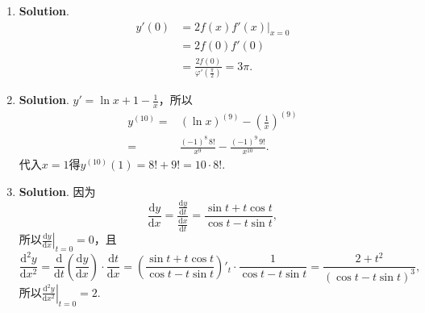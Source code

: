 \documentclass[../main.tex]{subfiles}
\begin{document}
\begin{enumerate}
    \item \textbf{Solution}.
          \[
              \begin{aligned}
                  y'(0) & =\left.2f(x)f'(x)\right|_{x=0}                          \\
                        & = 2f(0)f'(0)                                            \\
                        & =\frac{2f(0)}{\varphi'\left(\frac{\pi}{2}\right)}=3\pi.
              \end{aligned}
          \]

    \item \textbf{Solution}. $y'=\ln x+1-\frac{1}{x}$，所以
          \[
              \begin{aligned}
                  y^{(10)}= {} & \left(\ln x\right)^{(9)}-\left(\frac{1}{x}\right)^{(9)} \\
                  = {}         & \frac{(-1)^8\,8!}{x^9}-\frac{(-1)^9\,9!}{x^{10}}.
              \end{aligned}
          \]
          代入$x=1$得$y^{(10)}(1)=8!+9!=10\cdot8!$.

    \item \textbf{Solution}. 因为
          \[
              \frac{\mathrm{d}y}{\mathrm{d}x}=\frac{\frac{\mathrm{d}y}{\mathrm{d}t}}{\frac{\mathrm{d}x}{\mathrm{d}t}}
              =\frac{\sin t+t\cos t}{\cos t-t\sin t},
          \]
          所以$\left.\frac{\mathrm{d}y}{\mathrm{d}x}
              \right|_{t=0}=0$，且
          \[
              \frac{\mathrm{d}^{2}y}{\mathrm{d}x^{2}}=\frac{\mathrm{d}}{\mathrm{d}t}\left
              (\frac{\mathrm{d}y}{\mathrm{d}x}\right)\cdot\frac{\mathrm{d}t}{\mathrm{d}x}
              =\left(\frac{\sin t+t\cos t}{\cos t-t\sin t}\right)'_{t}\cdot\frac{1}{\cos
                  t-t\sin t}=\frac{2+t^{2}}{(\cos t-t\sin t)^{3}},
          \]
          所以$\left.\frac{\mathrm{d}^{2}y}{\mathrm{d}x^{2}}
              \right|_{t=0}=2$.
\end{enumerate}
\end{document}
